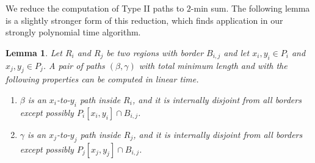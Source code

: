 \documentclass[11pt,twoside]{article}
\newtheorem{lemma}[theorem]{Lemma}
\newcommand{\spath}[1]{P_{#1}}
\newcommand{\region}[1]{R_{#1}}
\newcommand{\border}[2]{B_{#1,#2}}
\begin{document}
We reduce the computation of Type II paths to $2$-min sum.  The following lemma is a slightly stronger form of this reduction, which finds application in our strongly polynomial time algorithm. 

\begin{lemma}
 \label{lem:2minSumplus}
Let $\region{i}$ and $\region{j}$ be two regions with border $\border{i}{j}$ and let $x_i, y_i \in  \spath{i}$ and $x_j, y_j \in \spath{j}$.  A pair of paths $(\beta, \gamma)$ with total minimum length and with the following properties can be computed in linear time.
\begin{enumerate}
\item $\beta$ is an $x_i$-to-$y_i$ path inside $\region{i}$, and it is internally disjoint from all borders except possibly $\spath{i}[x_i, y_i] \cap \border{i}{j}$.
\item $\gamma$ is an $x_j$-to-$y_j$ path inside $\region{j}$, and it is internally disjoint from all borders except possibly $\spath{j}[x_j, y_j] \cap \border{i}{j}$.  
\end{enumerate}
\end{lemma}
\end{document}
